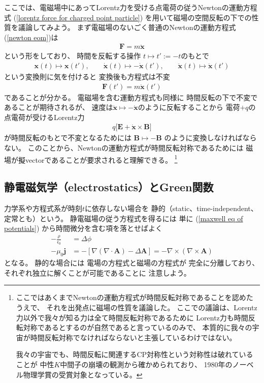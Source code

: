 ここでは、電磁場中にあってLorentz力を受ける点電荷の従うNewtonの運動方程式
(\ref{lorentz force for charged point particle})
を用いて磁場の空間反転の下での性質を議論してみよう。
まず電磁場のないごく普通のNewtonの運動方程式(\ref{newton eom})は
\begin{align}
  \bm{F} = m \ddot{ \bm{x} }
\end{align}
という形をしており、
時間を反転する操作
$t \mapsto t' := - t$のもとで
\begin{align}
  \bm{x}(t)
  \mapsto \bm{x}(t')
,\qquad
  \dot{ \bm{x} }(t)
  \mapsto - \dot{ \bm{x} }(t')
,\qquad
  \ddot{ \bm{x} }(t)
  \mapsto \ddot{ \bm{x} }(t')
\end{align}
という変換則に気を付けると
変換後も方程式は不変
\begin{align}
  \bm{F}(t') = m \ddot{ \bm{x} }(t')
\end{align}
であることが分かる。
電磁場を含む運動方程式も同様に
時間反転の下で不変であることが期待されるが、
速度は$\dot{\bm{x}} \mapsto - \dot{\bm{x}}$のように反転することから
電荷$+q$の点電荷が受けるLorentz力
\begin{align}
  q \Big[
    \bm{E}
  +
   \dot{\bm{x}}
    \times
    \bm{B}
  \Big]
\end{align}
が時間反転のもとで不変となるためには
$\bm{B} \mapsto - \bm{B}$
のように変換しなければならない。
このことから、Newtonの運動方程式が時間反転対称であるためには
磁場が擬vectorであることが要求されると理解できる。
\footnote{
  ここではあくまでNewtonの運動方程式が時間反転対称であることを認めたうえで、
  それを出発点に磁場の性質を議論した。
  ここでの議論は、Lorentz力以外で我々が知る力は全て時間反転対称であるために
  Lorentz力も時間反転対称であるとするのが自然であると言っているのみで、
  本質的に我々の宇宙が時間反転対称でなければならないと主張しているわけではない。

  我々の宇宙でも、時間反転に関連するCP対称性という対称性は破れていることが
  中性$K$中間子の崩壊の観測から確かめられており、
  1980年のノーベル物理学賞の受賞対象となっている。
}

\subsection{静電磁気学（electrostatics）とGreen関数}

力学系や方程式系が時刻$t$に依存しない場合を
静的（static、time-independent、定常とも）という。
静電磁場の従う方程式を得るには
単に
(\ref{maxwell eq of potentials})
から時間微分を含む項を落とせばよく
\begin{subequations}
\begin{align}
  - \frac{\rho}{\epsilon_0}
&=
  \Delta \phi
\label{static eq for ele-mag scalar potential}
\\
  - \mu_0 \bm{j}
&=
  - [
    \nabla
    ( \nabla \cdot \bm{A} )
  -
    \Delta \bm{A}
  ]
=
  - \nabla \times
    (\nabla \times \bm{A})
\label{static eq for ele-mag vector potential}
\end{align}
\end{subequations}
となる。
静的な場合には
電場の方程式と磁場の方程式が
完全に分離しており、
それぞれ独立に解くことが可能であることに
注意しよう。

